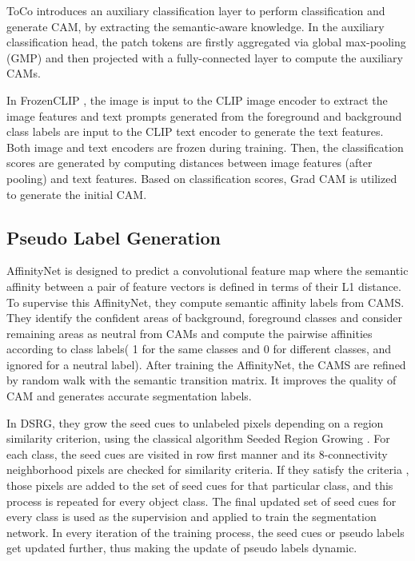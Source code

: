 ToCo \cite{wsss_toco_token_contrast} introduces an auxiliary classification layer to perform classification and generate CAM, by  extracting the semantic-aware knowledge.  In the auxiliary classification head, the patch tokens are firstly aggregated via global max-pooling (GMP) and then projected with a fully-connected layer to compute the auxiliary CAMs.

In FrozenCLIP \cite{wsss_frozen_clip}, the image is input to the CLIP image encoder to extract the image features and text prompts generated from the foreground and background class labels are input to the CLIP text encoder to generate the text features. Both image and text encoders are frozen during training.  Then, the classification scores are generated by computing distances between image features (after pooling) and text features. Based on classification scores, Grad CAM \cite{cam_grad} is utilized to generate the initial CAM.


\subsection{Pseudo Label Generation}
\label{subsec:pseudo-label-generation}
AffinityNet is designed to predict a convolutional feature map where the semantic affinity between a pair of feature vectors is defined in terms of their L1 distance. To supervise this AffinityNet, they compute semantic affinity labels  from CAMS. They identify the confident areas of background, foreground classes and consider remaining areas as neutral from CAMs and compute the pairwise affinities according to class labels( 1 for the same classes and 0 for different classes, and ignored for a neutral label). After training the AffinityNet, the CAMS are refined by random walk with the semantic transition matrix. It improves the quality of CAM and generates accurate segmentation labels.

In DSRG, they grow the seed cues to unlabeled pixels depending on a region similarity criterion, using the classical algorithm Seeded Region Growing \cite{srg}. For each class, the seed cues are visited in row first manner and its 8-connectivity neighborhood pixels are checked for similarity criteria. If they satisfy the criteria , those pixels are added to the set of seed cues for that particular class, and this process is repeated for every object class.  The final updated set of seed cues for every class is used as the supervision and applied to train the segmentation network. In every iteration of the training process, the seed cues or pseudo labels get updated further, thus making the update of pseudo labels dynamic.

